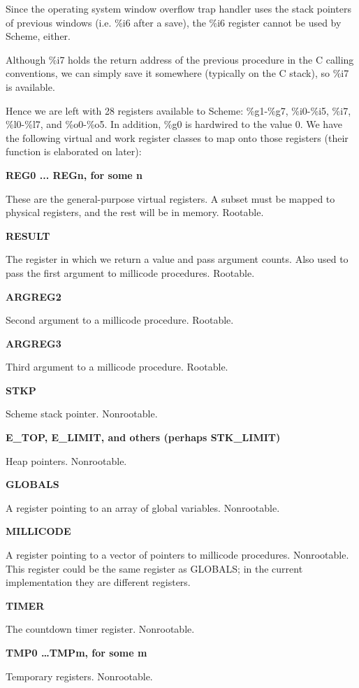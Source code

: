 Since the operating system window overflow trap handler uses the stack
pointers of previous windows (i.e. \%i6 after a save), the \%i6
register cannot be used by Scheme, either.

Although \%i7 holds the return address of the previous procedure in the
C calling conventions, we can simply save it somewhere (typically on
the C stack), so \%i7 is available.

Hence we are left with 28 registers available to Scheme: \%g1-\%g7,
\%i0-\%i5, \%i7, \%l0-\%l7, and \%o0-\%o5. In addition, \%g0 is hardwired
to the value 0. We have the following virtual and work register classes to
map onto those registers (their function is elaborated on later):

\vfill
\begin{description}

\item {\bf REG0 ... REGn, for some n}

These are the general-purpose virtual registers. A subset must be
mapped to physical registers, and the rest will be in memory.
Rootable.

\item {\bf RESULT}

The register in which we return a value and pass argument counts. Also used
to pass the first argument to millicode procedures. Rootable.

\item {\bf ARGREG2}

Second argument to a millicode procedure. Rootable.

\item {\bf ARGREG3}

Third argument to a millicode procedure. Rootable.

\item {\bf STKP}

Scheme stack pointer. Nonrootable.

\item {\bf E\_TOP, E\_LIMIT, and others (perhaps STK\_LIMIT)}

Heap pointers. Nonrootable.

\item {\bf GLOBALS}

A register pointing to an array of global variables. Nonrootable.

\item {\bf MILLICODE}

A register pointing to a vector of pointers to millicode procedures. 
Nonrootable. This register could be the same register as GLOBALS; in the
current implementation they are different registers.

\item {\bf TIMER}

The countdown timer register. Nonrootable.

\item {\bf TMP0 \ldots TMPm, for some m}

Temporary registers. Nonrootable.
\end{description}

